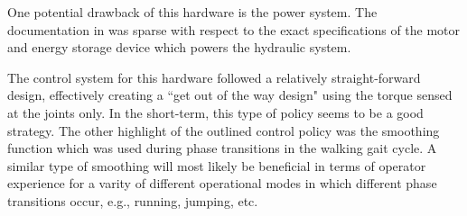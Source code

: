 One potential drawback of this hardware is the power system.  The documentation in \cite{} was sparse with respect to the exact specifications of the motor and energy storage device which powers the hydraulic system.

The control system for this hardware followed a relatively straight-forward design, effectively creating a ``get out of the way design" using the torque sensed at the joints only.  In the short-term, this type of policy seems to be a good strategy.  The other highlight of the outlined control policy was the smoothing function which was used during phase transitions in the walking gait cycle.  A similar type of smoothing will most likely be beneficial in terms of operator experience for a varity of different operational modes in which different phase transitions occur, e.g., running, jumping, etc.
 
 

 
 
 
 

